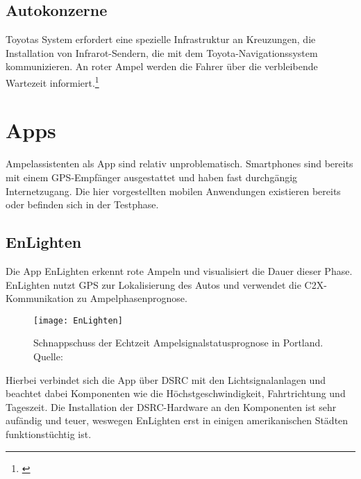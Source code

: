 \subsection{Autokonzerne}
Toyotas System erfordert eine spezielle Infrastruktur an Kreuzungen, die Installation von Infrarot-Sendern, die mit dem Toyota-Navigationssystem kommunizieren. An roter Ampel werden die Fahrer über die verbleibende Wartezeit informiert.\footnote{\cite{Toyota}}\\
%
%
\section{Apps}
Ampelassistenten als App sind relativ unproblematisch. Smartphones sind bereits mit einem \gls{GPS}-Empfänger ausgestattet und haben fast durchgängig Internetzugang. Die hier vorgestellten mobilen Anwendungen existieren bereits oder befinden sich in der Testphase.
\subsection{EnLighten}
Die \gls{App} EnLighten erkennt rote Ampeln und visualisiert die Dauer dieser Phase. EnLighten nutzt \gls{GPS} zur Lokalisierung des Autos und verwendet die \gls{C2X}-Kommunikation zu Ampelphasenprognose.
\begin{figure}[H]
    \centering
    \texttt{[image: EnLighten]}
    \label{fig:Ampelsignalstatus}
    \caption[EnLighten]{Schnappschuss der Echtzeit Ampelsignalstatusprognose in Portland. Quelle: \cite{EnLighten}}
\end{figure}
Hierbei verbindet sich die App über \gls{DSRC} mit den Lichtsignalanlagen und beachtet dabei Komponenten wie die Höchstgeschwindigkeit, Fahrtrichtung und Tageszeit. Die Installation der \gls{DSRC}-Hardware an den Komponenten ist sehr aufändig und teuer, weswegen EnLighten erst in einigen amerikanischen Städten funktionstüchtig ist.
